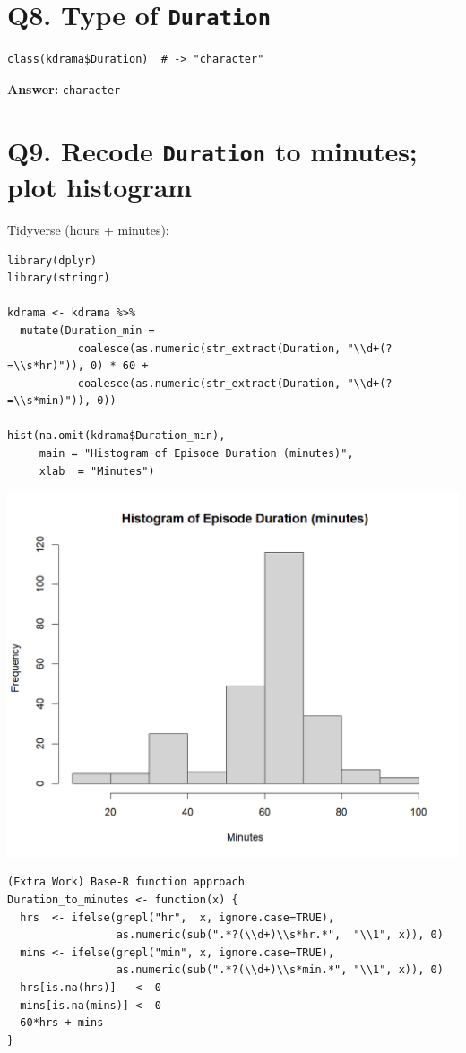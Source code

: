 \documentclass[11pt]{article}
\begin{document}
\section*{Q8. Type of \texttt{Duration}}
\begin{lstlisting}
class(kdrama$Duration)  # -> "character"
\end{lstlisting}
\textbf{Answer:} \texttt{character}

\section*{Q9. Recode \texttt{Duration} to minutes; plot histogram}
Tidyverse (hours + minutes):
\begin{lstlisting}
library(dplyr)
library(stringr)

kdrama <- kdrama %>%
  mutate(Duration_min =
           coalesce(as.numeric(str_extract(Duration, "\\d+(?=\\s*hr)")), 0) * 60 +
           coalesce(as.numeric(str_extract(Duration, "\\d+(?=\\s*min)")), 0))

hist(na.omit(kdrama$Duration_min),
     main = "Histogram of Episode Duration (minutes)",
     xlab  = "Minutes")
\end{lstlisting}

\begin{center}
\includegraphics[width=.8\linewidth]{histogram of Duraton.png}
\end{center}


\begin{lstlisting}
(Extra Work) Base-R function approach 
Duration_to_minutes <- function(x) {
  hrs  <- ifelse(grepl("hr",  x, ignore.case=TRUE),
                 as.numeric(sub(".*?(\\d+)\\s*hr.*",  "\\1", x)), 0)
  mins <- ifelse(grepl("min", x, ignore.case=TRUE),
                 as.numeric(sub(".*?(\\d+)\\s*min.*", "\\1", x)), 0)
  hrs[is.na(hrs)]   <- 0
  mins[is.na(mins)] <- 0
  60*hrs + mins
}
\end{lstlisting}
\end{document}
